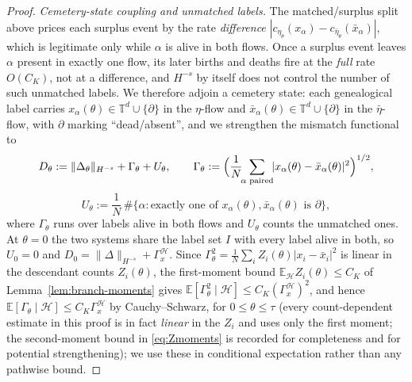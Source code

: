 \documentclass[a4paper,fleqn]{cas-sc}
\theoremstyle{definition}
\theoremstyle{remark}
\begin{document}
\begin{proof}
\emph{Cemetery-state coupling and unmatched labels.} The matched/surplus split above
prices each surplus event by the rate \emph{difference}
$|c_{\eta_\theta}(x_\alpha)-c_{\bar\eta_\theta}(\bar x_\alpha)|$, which is legitimate
only while $\alpha$ is alive in both flows. Once a surplus event leaves $\alpha$ present
in exactly one flow, its later births and deaths fire at the \emph{full} rate $O(C_K)$,
not at a difference, and $H^{-s}$ by itself does not control the number of such
unmatched labels. We therefore adjoin a cemetery state: each genealogical label carries
$x_\alpha(\theta)\in\mathbb T^d\cup\{\partial\}$ in the $\eta$-flow and
$\bar x_\alpha(\theta)\in\mathbb T^d\cup\{\partial\}$ in the $\bar\eta$-flow, with
$\partial$ marking ``dead/absent'', and we strengthen the mismatch functional to
\[
D_\theta:=\|\Delta_\theta\|_{H^{-s}}+\Gamma_\theta+U_\theta,\qquad
\Gamma_\theta:=\Bigl(\frac1N\!\!\sum_{\alpha\text{ paired}}\!\!|x_\alpha(\theta)-\bar x_\alpha(\theta)|^2\Bigr)^{1/2},
\]
\[
U_\theta:=\frac1N\,\#\bigl\{\alpha:\text{exactly one of }x_\alpha(\theta),\bar x_\alpha(\theta)\text{ is }\partial\bigr\},
\]
where $\Gamma_\theta$ runs over labels alive in both flows and $U_\theta$ counts the
unmatched ones. At $\theta=0$ the two systems share the label set $I$ with every label
alive in both, so $U_0=0$ and $D_0=\|\Delta\|_{H^{-s}}+\Gamma_x^{\mathcal H}$. Since
$\Gamma_\theta^2=\frac1N\sum_i Z_i(\theta)|x_i-\bar x_i|^2$ is linear in the descendant
counts $Z_i(\theta)$, the first-moment bound $\mathbb E_{\mathcal H}Z_i(\theta)\le C_K$
of Lemma~\ref{lem:branch-moments} gives
$\mathbb E[\Gamma_\theta^2\mid\mathcal H]\le C_K(\Gamma_x^{\mathcal H})^2$, and hence
$\mathbb E[\Gamma_\theta\mid\mathcal H]\le C_K\Gamma_x^{\mathcal H}$ by Cauchy--Schwarz,
for $0\le\theta\le\tau$ (every count-dependent estimate in this proof is in fact
\emph{linear} in the $Z_i$ and uses only the first moment; the second-moment bound
in \eqref{eq:Zmoments} is recorded for completeness and for potential strengthening);
we use these in conditional expectation rather than any pathwise bound.


\end{proof}
\end{document}
